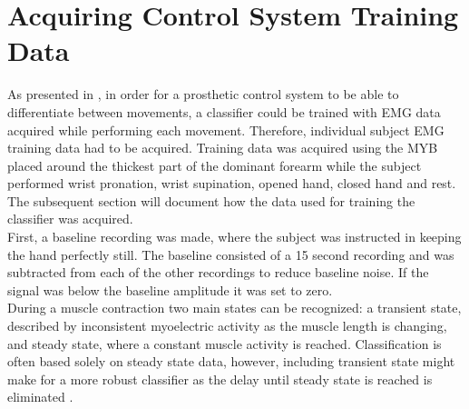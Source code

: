 
\section{Acquiring Control System Training Data}

As presented in , in order for a prosthetic control system to be able to differentiate between movements, a classifier could be trained with EMG data acquired while performing each movement. Therefore, individual subject EMG training data had to be acquired. Training data was acquired using the MYB placed around the thickest part of the dominant forearm while the subject performed wrist pronation, wrist supination, opened hand, closed hand and rest. The subsequent section will document how the data used for training the classifier was acquired. \\
First, a baseline recording was made, where the subject was instructed in keeping the hand perfectly still. The baseline consisted of a 15 second recording and was subtracted from each of the other recordings to reduce baseline noise. If the signal was below the baseline amplitude it was set to zero. \\
During a muscle contraction two main states can be recognized: a transient state, described by inconsistent myoelectric activity as the muscle length is changing, and steady state, where a constant muscle activity is reached. \cite{Mobarak2014} Classification is often based solely on steady state data, however, including transient state might make for a more robust classifier as the delay until steady state is reached is eliminated \cite{Boschmann2013,Mobarak2014a}. \\
%


